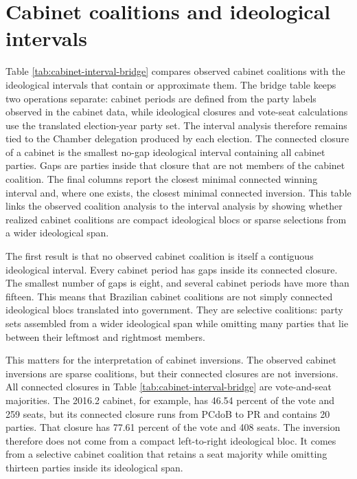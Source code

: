 \documentclass[11pt]{article}
\newcommand{\RepoRoot}{/home/marcelo/Sync/Projects/electoral-inversion}%
\newcommand{\RepoRoot}{/home/marcelovmaciel/Sync/Projects/electoral_inversions}%
\newcommand{\ArtifactRoot}{\RepoRoot/processing/Processing/output/paper}
\begin{document}



\section{Cabinet coalitions and ideological intervals}
\label{app:cabinet-interval-bridge}

Table \ref{tab:cabinet-interval-bridge} compares observed cabinet coalitions
with the ideological intervals that contain or approximate them. The bridge
table keeps two operations separate: cabinet periods are defined from the party
labels observed in the cabinet data, while ideological closures and vote-seat
calculations use the translated election-year party set. The interval analysis
therefore remains tied to the Chamber delegation produced by each election.
The connected closure of a cabinet is the smallest no-gap ideological interval
containing all cabinet parties. Gaps are parties inside that closure that are
not members of the cabinet coalition. The final columns report the closest
minimal connected winning interval and, where one exists, the closest minimal
connected inversion. This table links the observed coalition analysis to the
interval analysis by showing whether realized cabinet coalitions are compact
ideological blocs or sparse selections from a wider ideological span.



The first result is that no observed cabinet coalition is itself a contiguous
ideological interval. Every cabinet period has gaps inside its connected closure.
The smallest number of gaps is eight, and several cabinet periods have more than
fifteen. This means that Brazilian cabinet coalitions are not simply connected
ideological blocs translated into government. They are selective coalitions: party
sets assembled from a wider ideological span while omitting many parties that
lie between their leftmost and rightmost members.

This matters for the interpretation of cabinet inversions. The observed cabinet
inversions are sparse coalitions, but their connected closures are not inversions.
All connected closures in Table \ref{tab:cabinet-interval-bridge} are
vote-and-seat majorities. The 2016.2 cabinet, for example, has 46.54 percent of
the vote and 259 seats, but its connected closure runs from PCdoB to PR and
contains 20 parties. That closure has 77.61 percent of the vote and 408 seats.
The inversion therefore does not come from a compact left-to-right ideological
bloc. It comes from a selective cabinet coalition that retains a seat majority
while omitting thirteen parties inside its ideological span.
\end{document}
